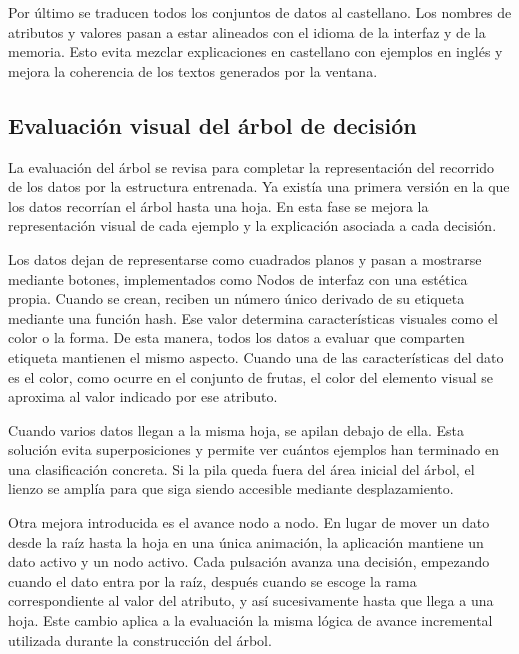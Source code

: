 Por último se traducen todos los conjuntos de datos al castellano.
Los nombres de atributos y valores pasan a estar alineados con el idioma de la interfaz y de la memoria.
Esto evita mezclar explicaciones en castellano con ejemplos en inglés y mejora la coherencia de los textos generados por la ventana.


\subsection{Evaluación visual del árbol de decisión}

La evaluación del árbol se revisa para completar la representación del recorrido de los datos por la estructura entrenada.
Ya existía una primera versión en la que los datos recorrían el árbol hasta una hoja.
En esta fase se mejora la representación visual de cada ejemplo y la explicación asociada a cada decisión.

Los datos dejan de representarse como cuadrados planos y pasan a mostrarse mediante botones, implementados como \gls{Nodo}s de interfaz con una estética propia.
Cuando se crean, reciben un número único derivado de su etiqueta mediante una función hash.
Ese valor determina características visuales como el color o la forma.
De esta manera, todos los datos a evaluar que comparten etiqueta mantienen el mismo aspecto.
Cuando una de las características del dato es el color, como ocurre en el conjunto de frutas, el color del elemento visual se aproxima al valor indicado por ese atributo.

Cuando varios datos llegan a la misma hoja, se apilan debajo de ella.
Esta solución evita superposiciones y permite ver cuántos ejemplos han terminado en una clasificación concreta.
Si la pila queda fuera del área inicial del árbol, el lienzo se amplía para que siga siendo accesible mediante desplazamiento.

Otra mejora introducida es el avance \gls{nodo} a \gls{nodo}.
En lugar de mover un dato desde la raíz hasta la hoja en una única animación, la aplicación mantiene un dato activo y un \gls{nodo} activo.
Cada pulsación avanza una decisión, empezando cuando el dato entra por la raíz, después cuando se escoge la rama correspondiente al valor del atributo, y así sucesivamente hasta que llega a una hoja.
Este cambio aplica a la evaluación la misma lógica de avance incremental utilizada durante la construcción del árbol.

